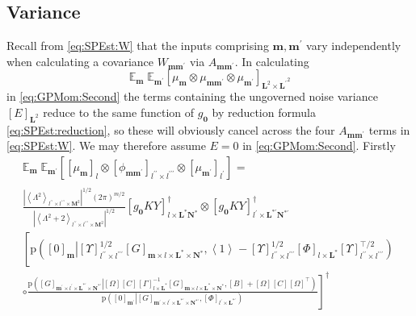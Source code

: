\documentclass[preprint,12pt]{elsarticle}
\newcommand*{\M}[1]{\ensuremath{#1}\xspace}
\newcommand*{\x}{\times}
\newcommand*{\mi}[1]{\mathbf{#1}}
\newcommand*{\te}[2][]{\left\lbrack{#2}\right\rbrack_{#1}}
\newcommand*{\diag}[2][]{\left\langle{#2}\right\rangle_{#1}}
\newcommand*{\prob}[3]{\M{\mathrm{p}\!\left(\left.{#1}\right\vert{#2,#3}\right)}}
\newcommand*{\evt}[3][]{\mathbb{E}_{#3}^{#1}\!#2}
\newcommand*{\modulus}[1]{\M{\left\lvert{#1}\right\rvert}}
\begin{document}
    \subsection{Variance}\label{sub:GPEst:Variance}
        Recall from \cref{eq:SPEst:W} that the inputs comprising $\mi{m},\mi{m^{\prime}}$ vary independently when calculating a covariance $W_{\mi{m m^{\prime}}}$ via $A_{\mi{m m^{\prime}}}$. In calculating
        \begin{equation*}
            \evt{\;\evt{\te[\mi{L}^{2} \x \mi{L^{\prime}}^{2}]{\mu_{\mi{m}} \otimes \mu_{\mi{mm^{\prime}}} \otimes \mu_{\mi{m^{\prime}}}}}{\mi{m^{\prime}}}}{\mi{m}}
        \end{equation*}
        in \cref{eq:GPMom:Second} the terms containing the ungoverned noise variance $\te[\mi{L}^2]{E}$ reduce to the same function of $g_{\mi{0}}$ by reduction formula \cref{eq:SPEst:reduction}, so these will obviously cancel across the four $A_{\mi{m m^{\prime}}}$ terms in \cref{eq:SPEst:W}. 
        We may therefore assume $E=0$ in \cref{eq:GPMom:Second}. Firstly
        \begin{multline*}
            \evt{\;\evt{\te[]{\te[l]{\mu_{\mi{m}}} \otimes \te[l^{\prime\prime}\x l^{\prime\prime\prime}]{\phi_{\mi{mm^{\prime}}}} \otimes \te[l^{\prime}]{\mu_{\mi{m^{\prime}}}}}}{\mi{m^{\prime}}}}{\mi{m}} = \\
            \frac
            {\modulus{\diag[l^{\prime\prime}\x l^{\prime\prime\prime}\x\mi{M}^{2}]{\Lambda^{2}}}^{1/2}(2\pi)^{m/2}}
            {\modulus{\diag[l^{\prime\prime}\x l^{\prime\prime\prime}\x\mi{M}^2]{\Lambda^{2}+2}}^{1/2}}
            \te[l\x\mi{L^{*}N^{*}}]{g_{\mi{0}}KY}^{\dagger} \otimes
            \te[l^{\prime}\x\mi{L^{*\prime}N^{*\prime}}]{g_{\mi{0}}KY}^{\dagger} \\
            \left\lbrack
            \prob{\te[\mi{m}]{0}}{\te[l^{\prime\prime}\x l^{\prime\prime\prime}]{\Upsilon}^{1/2} \te[\mi{m}\x l\x \mi{L^{*}\x N^{*}}]{G}} 
            {\diag[]{1} -
            \te[l^{\prime\prime}\x l^{\prime\prime\prime}]{\Upsilon}^{1/2} \te[l\x \mi{L^{*}}]{\Phi}\te[l^{\prime\prime}\x l^{\prime\prime\prime}]{\Upsilon}^{\intercal/2}} \phantom{\frac{_{\vert}^{\vert}}{_{\vert}^{\vert}}} \right.\\
            \left. \circ 
                \frac{
                    \prob{\te[\mi{m^{\prime}}\x l^{\prime}\x \mi{L^{*\prime}\x N^{*\prime}}]{G}}
                    {\te[]{\Omega} \te[]{C} \te[l\x \mi{L^{*}}]{\Gamma}^{-1} \te[\mi{m}\x l\x \mi{L^{*}\x N^{*}}]{G}}{\te[]{B}+\te[]{\Omega} \te[]{C} \te[]{\Omega}^{\intercal}}}
                    {\prob{\te[\mi{m^{\prime}}]{0}}{\te[\mi{m^{\prime}}\x l^{\prime}\x \mi{L^{*\prime}\x N^{*\prime}}]{G}}{\te[l^{\prime}\x \mi{L^{*\prime}}]{\Phi}}}
            \right\rbrack^{\dagger}
        \end{multline*}
\end{document}
